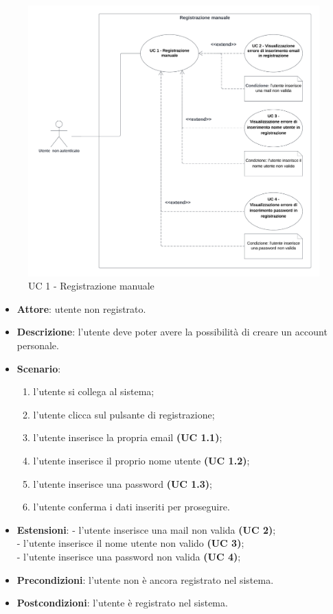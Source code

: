 \begin{figure}[!h]
    \includegraphics[width=15cm]{sezioni/Images/UC1.png}
    \centering
    \caption{UC 1 - Registrazione manuale}
\end{figure}

\begin{itemize}
    \item \textbf{Attore}: utente non registrato.
    \item \textbf{Descrizione}: l’utente deve poter avere la possibilità di creare un account personale.
    \item \textbf{Scenario}:
    \begin{enumerate}
        \item l’utente si collega al sistema;
        \item l’utente clicca sul pulsante di registrazione;
        \item l’utente inserisce la propria email \textbf{(UC 1.1)};
        \item l’utente inserisce il proprio nome utente \textbf{(UC 1.2)};
        \item l’utente inserisce una password \textbf{(UC 1.3)};
        \item l’utente conferma i dati inseriti per proseguire.
    \end{enumerate}
    \item \textbf{Estensioni}:
        - l’utente inserisce una mail non valida  \textbf{(UC 2)};\\
        - l’utente inserisce il nome utente non valido \textbf{(UC 3)};\\
        - l’utente inserisce una password non valida \textbf{(UC 4)};\\

    \item \textbf{Precondizioni}: l’utente non è ancora registrato nel sistema.
    \item \textbf{Postcondizioni}: l’utente è registrato nel sistema.
\end{itemize}

